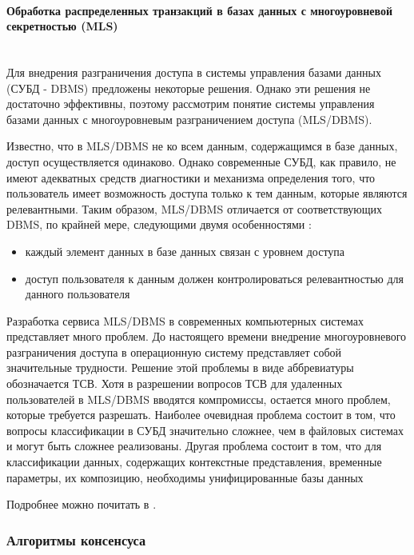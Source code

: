 \paragraph{Обработка распределенных транзакций в базах данных с многоуровневой секретностью (MLS)}~\\

Для внедрения разграничения доступа в системы  управления  базами  данных  (СУБД  -
DBMS)  предложены некоторые решения. Однако эти решения не достаточно
эффективны, поэтому рассмотрим понятие  системы
управления  базами  данных  с  многоуровневым  разграничением доступа (MLS/DBMS).

Известно, что в MLS/DBMS не ко всем данным, содержащимся в  базе
данных, доступ осуществляется одинаково. Однако современные СУБД, как
правило,  не имеют адекватных средств диагностики и механизма определения
того, что пользователь имеет возможность доступа только  к  тем
данным,  которые являются релевантными. Таким образом, MLS/DBMS отличается
от соответствующих DBMS,  по крайней  мере,  следующими  двумя
особенностями \autocite{SecureFix}:
\begin{itemize}
    \item каждый элемент данных в базе данных связан с уровнем доступа
    \item доступ пользователя к данным должен контролироваться релевантностью для данного пользователя
\end{itemize}
Разработка сервиса MLS/DBMS в современных компьютерных  системах
представляет  много  проблем. До настоящего времени внедрение многоуровневого
разграничения доступа в операционную  систему  представляет
собой  значительные трудности. Решение этой проблемы в виде аббревиатуры
обозначается ТСВ. Хотя в разрешении вопросов ТСВ  для  удаленных
пользователей  в  MLS/DBMS вводятся компромиссы, остается много проблем,
которые требуется разрешать. Наиболее очевидная проблема состоит
в том, что вопросы классификации в СУБД значительно  сложнее,  чем  в
файловых  системах  и могут быть сложнее реализованы. Другая проблема
состоит в том, что для классификации данных,  содержащих  контекстные
представления,  временные параметры, их композицию, необходимы унифицированные базы данных 

Подробнее можно почитать в \autocite{SecureFix}.

\subsubsection{Алгоритмы консенсуса}

